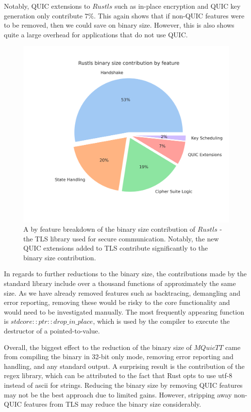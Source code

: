 Notably, QUIC extensions to $Rustls$ such as in-place encryption and QUIC key generation only contribute $7\%$.
This again shows that if non-QUIC features were to be removed, then we could save on binary size.
However, this is also shows quite a large overhead for applications that do not use QUIC.

\begin{figure}[ht]
    \centering
    \includegraphics[width=0.75\linewidth]{images/rustls_binary_by_function.png}
    \caption{A by feature breakdown of the binary size contribution of $Rustls$ - the TLS library used for secure communication. Notably, the new QUIC extensions added to TLS contribute significantly to the binary size contribution.}
    \label{fig:tls_bin_func}
\end{figure}

In regards to further reductions to the binary size, the contributions made by the standard library include over a thousand functions of approximately the same size.
As we have already removed features such as backtracing, demangling and error reporting, removing these would be risky to the core functionality and would need to be investigated manually.
The most frequently appearing function is $std core::ptr::drop\_in\_place$, which is used by the compiler to execute the destructor of a pointed-to-value.

Overall, the biggest effect to the reduction of the binary size of $MQuicTT$ came from compiling the binary in 32-bit only mode, removing error reporting and handling, and any standard output.
A surprising result is the contribution of the regex library, which can be attributed to the fact that Rust opts to use utf-8 instead of ascii for strings.
Reducing the binary size by removing QUIC features may not be the best approach due to limited gains.
However, stripping away non-QUIC features from TLS may reduce the binary size considerably.
